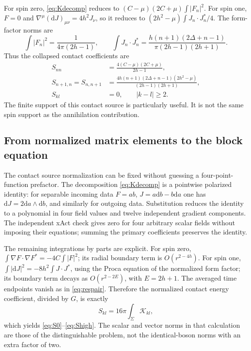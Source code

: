 \documentclass[11pt,a4paper]{article}
\numberwithin{equation}{section}
\theoremstyle{remark}\newtheorem{remark}[theorem]{Remark}
\newcommand{\dd}{\mathrm d}
\begin{document}
For spin zero, \eqref{eq:Kdecomp} reduces to
$(C-\mu)(2C+\mu)\int|F_n|^2$. For spin one, $F=0$ and
$\nabla^\mu(\dd J)_{\mu\nu}=4h^2J_\nu$, so it reduces to
$(2h^2-\mu)\int J_n\cdot J_n^*/4$. The form-factor norms are
\begin{equation}
 \int|F_n|^2=\frac1{4\pi(2h-1)},\qquad
 \int J_n\cdot J_n^*=\frac{h(n+1)(2\Delta+n-1)}{\pi(2h-1)(2h+1)}.
\end{equation}
Thus the collapsed contact coefficients are
\begin{align}
 S_{nn}&=\frac{4(C-\mu)(2C+\mu)}{2h-1},\label{eq:S0}\\
 S_{n+1,n}=S_{n,n+1}
 &=\frac{4h(n+1)(2\Delta+n-1)(2h^2-\mu)}{(2h-1)(2h+1)},\label{eq:S1}\\
 S_{kl}&=0,\qquad |k-l|\geq2.\label{eq:Shigh}
\end{align}
The finite support of this contact source is particularly useful. It is not the same spin support as the annihilation contribution.

\subsection{From normalized matrix elements to the block equation}
\label{sec:lognormalization}

The contact source normalization can be fixed without guessing a four-point-function prefactor. The decomposition \eqref{eq:Kdecomp} is a pointwise polarized identity: for separable incoming data $F=ab$, $J=a\dd b-b\dd a$ one has $\dd J=2\dd a\wedge\dd b$, and similarly for outgoing data. Substitution reduces the identity to a polynomial in four field values and twelve independent gradient components. The independent xAct check gives zero for four arbitrary scalar fields without imposing their equations; summing the primary coefficients preserves the identity.

The remaining integrations by parts are explicit. For spin zero,
$\int\nabla F\cdot\nabla F^*=-4C\int|F|^2$; its radial boundary term is $O(r^{2-4h})$. For spin one,
$\int|\dd J|^2=-8h^2\int J\cdot J^*$, using the Proca equation of the normalized form factor; its boundary term decays as $O(r^{2-2E})$, with $E=2h+1$. The averaged time endpoints vanish as in \eqref{eq:respair}. Therefore the normalized contact energy coefficient, divided by $G$, is exactly
\begin{equation}
 S_{kl}=16\pi\int_\Sigma\mathcal K_{kl},
 \label{eq:sourceunits}
\end{equation}
which yields \eqref{eq:S0}--\eqref{eq:Shigh}. The scalar and vector norms in that calculation are those of the distinguishable problem, not the identical-boson norms with an extra factor of two.
\end{document}
